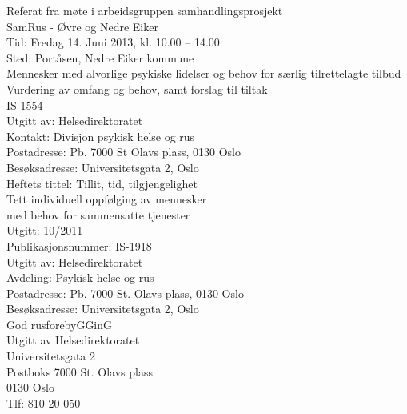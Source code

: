 \documentclass[11pt]{report} %
\begin{document}
\begin{thebibliography}{99}
                  Referat fra møte i arbeidsgruppen samhandlingsprosjekt\\ 
                  SamRus - Øvre og Nedre Eiker\\
                  Tid: Fredag 14. Juni 2013,  kl. 10.00 – 14.00\\
                  Sted: Portåsen, Nedre Eiker kommune\\

                  Mennesker med alvorlige psykiske lidelser og behov for særlig tilrettelagte tilbud Vurdering av omfang og behov, samt forslag til tiltak\\
                  IS-1554\\
                  Utgitt av: Helsedirektoratet\\
                  Kontakt: Divisjon psykisk helse og rus\\
                  Postadresse: Pb. 7000 St Olavs plass, 0130 Oslo\\
                  Besøksadresse: Universitetsgata 2, Oslo\\

                  Heftets tittel: Tillit, tid, tilgjengelighet\\
                  Tett individuell oppfølging av mennesker\\
                  med behov for sammensatte tjenester\\
                  Utgitt: 10/2011\\
                  Publikasjonsnummer: IS-1918\\
                  Utgitt av: Helsedirektoratet\\
                  Avdeling: Psykisk helse og rus\\
                  Postadresse: Pb. 7000 St. Olavs plass, 0130 Oslo\\
                  Besøksadresse: Universitetsgata 2, Oslo\\

                  God rusforebyGGinG\\
                  Utgitt av Helsedirektoratet\\
                  Universitetsgata 2\\
                  Postboks 7000 St. Olavs plass\\
                  0130 Oslo\\
                  Tlf: 810 20 050\\
  




              \end{thebibliography}

              \listoffigures
              \listoftables

              
\end{document}
